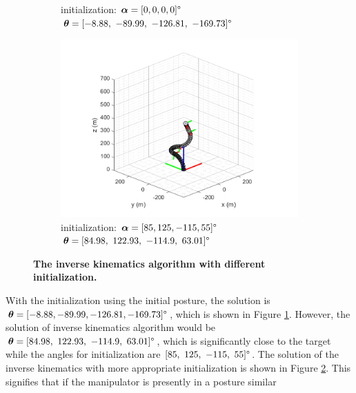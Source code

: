 \begin{figure}[H]
\begin{subfigure}{0.45\textwidth}
        \caption{\centering initialization: $\boldsymbol{\alpha} = [0, 0, 0, 0]\degree$ \\
        $\boldsymbol{\theta} = [-8.88,\ -89.99,\ -126.81,\ -169.73]\degree$ }
        \label{fig:complex_init_0_0_0_0}
    \end{subfigure}
    \begin{subfigure}{0.45\textwidth} %
        \centering
        \includegraphics[width=\linewidth]{Image/MATLAB/manipulator_84.98_122.93_-114.9_63.01.png}
        \caption{\centering initialization: $\boldsymbol{\alpha} = [85, 125, -115, 55]\degree$ \\
        $\boldsymbol{\theta} = [84.98,\ 122.93,\ -114.9,\ 63.01]\degree$ }
        \label{fig:complex_init_85_125_-115_55}
    \end{subfigure}
    \caption[The kinematics model of manipulator with respective bending modules]
    {\centering \textbf{The inverse kinematics algorithm with different initialization.}}
    \label{fig:80_120_-120_90_diff_initial}
\end{figure}
\noindent With the initialization using the initial posture, the solution is 
$\boldsymbol{\theta} = [-8.88, -89.99, -126.81, -169.73]\degree$, which is shown in Figure \ref{fig:complex_init_0_0_0_0}. 
However, the solution of inverse kinematics algorithm would be $\boldsymbol{\theta} = [84.98,\ 122.93,\ -114.9,\ 63.01]\degree$, 
which is significantly close to the target while the angles for initialization are $[85,\ 125,\ -115,\ 55]\degree$. 
The solution of the inverse kinematics with more appropriate initialization is shown in Figure 
\ref{fig:complex_init_85_125_-115_55}. This signifies that if the manipulator is presently in a posture similar 
